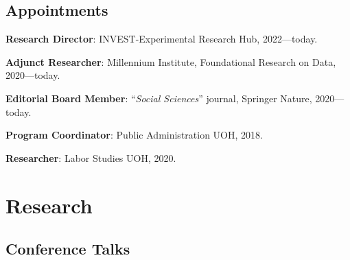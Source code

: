 \documentclass[letterpaper]{article}
\renewenvironment{itemize}{
  \begin{list}{}{
    \setlength{\leftmargin}{1.5em}
  }
}{
  \end{list}
}
\begin{document}
{\unskip}

\subsection*{Appointments}

\begin{itemize}
  \item[\textcolor{gray}{\textbullet}] {\bf Research Director}: INVEST-Experimental Research Hub, 2022---today.
  \item[\textcolor{gray}{\textbullet}] {\bf Adjunct Researcher}: Millennium Institute, Foundational Research on Data, 2020---today.
  \item[\textcolor{gray}{\textbullet}] {\bf Editorial Board Member}: ``\emph{Social Sciences}'' journal, Springer Nature, 2020---today.
  \item[\textcolor{gray}{\textbullet}] {\bf Program Coordinator}: Public Administration UOH, 2018.
  \item[\textcolor{gray}{\textbullet}] {\bf Researcher}: Labor Studies UOH, 2020.
\end{itemize}

\section*{Research}
{\unskip}



{}



\subsection*{Conference Talks}

{\unskip}


\end{document}
